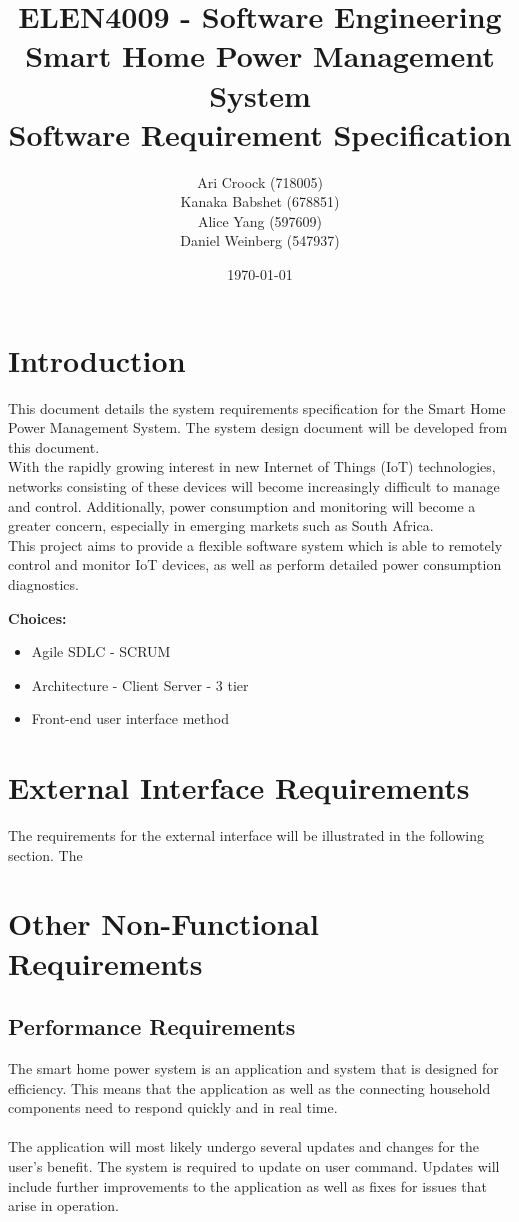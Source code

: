\documentclass[11pt, a4paper]{article}
\title{ELEN4009 - Software Engineering\\Smart Home Power Management System\\Software Requirement Specification}
\author{Ari Croock (718005)\\Kanaka Babshet (678851)\\Alice Yang (597609)\\Daniel Weinberg (547937)}
\date{\today}
\begin{document}
	\maketitle
	\section{Introduction}
	
	This document details the system requirements specification for the Smart Home Power Management System. The system design document will be developed from this document.\\
	
	With the rapidly growing interest in new Internet of Things (IoT) technologies, networks consisting of these devices will become increasingly difficult to manage and control. Additionally, power consumption and monitoring will become a greater concern, especially in emerging markets such as South Africa.\\
	
	This project aims to provide a flexible software system which is able to remotely control and monitor IoT devices, as well as perform detailed power consumption diagnostics.
	
	\textbf{Choices:} 
	\begin{itemize}
		\item Agile SDLC - SCRUM 
		\item Architecture - Client Server - 3 tier
		\item Front-end user interface method
	\end{itemize}
	
	
	\section{External Interface Requirements}
	The requirements for the external interface will be illustrated in the following section. The 
	
	\section{Other Non-Functional Requirements}
	
	\subsection{Performance Requirements}
	The smart home power system is an application and system that is designed for efficiency. This means that the application as well as the connecting household components need to respond quickly and in real time. 
	\\\\
	The application will most likely undergo several updates and changes for the user's benefit. The system is required to update on user command. Updates will include further improvements to the application as well as fixes for issues that arise in operation.
	
\end{document}
